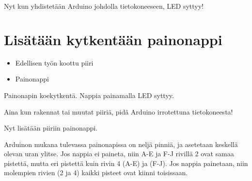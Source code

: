Nyt kun yhdistetään Arduino johdolla tietokoneeseen, LED syttyy!

\section{Lisätään kytkentään painonappi}

\begin{minipage}{0.5\textwidth}
\begin{tcolorbox}[colback=lime!10,title=Tarvikkeet, colbacktitle=green!10,coltitle=black]
\begin{itemize}
    \item Edellisen työn koottu piiri
    \item Painonappi
\end{itemize}
\end{tcolorbox}
\end{minipage}
\begin{minipage}{0.5\textwidth}
\begin{tcolorbox}[colback=blue!10,title=Piirin toiminta,colbacktitle=purple!90]
Painonapin koekytkentä. Nappia painamalla LED syttyy.
\tcblower
\begin{center}
\end{center}
\end{tcolorbox}
\end{minipage}

\begin{tcolorbox}[colback=red!10,colbacktitle=red,title=HUOM!]
Aina kun rakennat tai muutat piiriä, pidä Arduino irrotettuna tietokoneesta! 
\end{tcolorbox}

Nyt lisätään piiriin painonappi. 

\begin{tcolorbox}[title=Painonapin kytkeminen,colback=blue!10,colbacktitle=purple!90]
Arduinon mukana tulevassa painonapissa on neljä pinniä, ja asetetaan keskellä olevan uran ylitse. Jos nappia ei paineta, niin A-E ja F-J rivillä 2 ovat samaa pistettä, mutta eri pistettä kuin rivin 4 (A-E) ja (F-J). Jos nappia painetaan, niin molempien rivien (2 ja 4) kaikki pisteet ovat kiinni toisissaan.


\end{tcolorbox}

